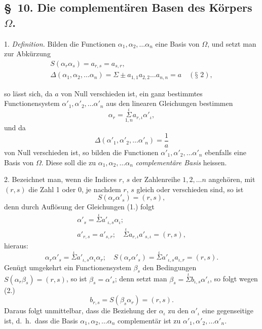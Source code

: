 \documentclass{article}
\begin{document}
\subsection*{§~10. Die complementären Basen des Körpers $\Omega$.}

1. \emph{Definition.} Bilden die Functionen $\alpha_{1}, \alpha_{2}, \ldots \alpha_{n}$ eine Basis von $\Omega$, und setzt man zur Abkürzung
\[ \begin{gathered} S(\alpha_{r}\alpha_{s}) = a_{r,s} = a_{s,r}, \\ \Delta(\alpha_{1}, \alpha_{2}, \ldots \alpha_{n}) = \Sigma \pm a_{1,1}a_{2,2}\ldots a_{n,n} = a \quad (\text{§~2}), \end{gathered} \]

so lässt sich, da $a$ von Null verschieden ist, ein ganz bestimmtes Functionensystem $\alpha'_{1}, \alpha'_{2}, \ldots \alpha'_{n}$ aus den linearen Gleichungen bestimmen
\[ \alpha_{r} = \overset{\iota}{\underset{1,n}{\Sigma}} a_{r,\iota}\alpha'_{\iota}, \tag{1.} \]
und da
\[ \Delta(\alpha'_{1}, \alpha'_{2}, \ldots \alpha'_{n}) = \frac{1}{a} \]
von Null verschieden ist, so bilden die Functionen $\alpha'_{1}, \alpha'_{2}, \ldots \alpha'_{n}$ ebenfalls eine Basis von $\Omega$. Diese soll die zu $\alpha_{1}, \alpha_{2}, \ldots \alpha_{n}$ \emph{complementäre Basis} heissen.

2. Bezeichnet man, wenn die Indices $r$, $s$ der Zahlenreihe $1, 2, \ldots n$ angehören, mit $(r, s)$ die Zahl 1 oder 0, je nachdem $r$, $s$ gleich oder verschieden sind, so ist
\[ S(\alpha_{r}\alpha'_{s}) = (r, s), \tag{2.} \]
denn durch Auflösung der Gleichungen (1.) folgt
\[ \begin{gathered} \alpha'_{s} = \overset{\iota}{\Sigma} a'_{\iota,s}\alpha_{\iota}; \\ a'_{r,s} = a'_{s,r}; \quad \overset{\iota}{\Sigma} a_{r,\iota}a'_{s,\iota} = (r, s), \end{gathered} \]
hieraus:
\[ \alpha_{r}\alpha'_{s} = \overset{\iota}{\Sigma} a'_{\iota,s}\alpha_{\iota}\alpha_{r}; \quad S(\alpha_{r}\alpha'_{s}) = \overset{\iota}{\Sigma} a'_{\iota,s}a_{\iota,r} = (r, s). \]
Genügt umgekehrt ein Functionensystem $\beta_{s}$ den Bedingungen $S(\alpha_{r}\beta_{s}) = (r, s)$, so ist $\beta_{s} = \alpha'_{s}$; denn setzt man $\beta_{s} = \overset{\iota}{\Sigma} b_{\iota,s}\alpha'_{\iota}$, so folgt wegen (2.)
\[ b_{r,s} = S(\beta_{s}\alpha_{r}) = (r, s). \]
Daraus folgt unmittelbar, dass die Beziehung der $\alpha_{\iota}$ zu den $\alpha'_{\iota}$ eine gegenseitige ist, d.\ h.\ dass die Basis $\alpha_{1}, \alpha_{2}, \ldots \alpha_{n}$ complementär ist zu $\alpha'_{1}, \alpha'_{2}, \ldots \alpha'_{n}$.
\end{document}
